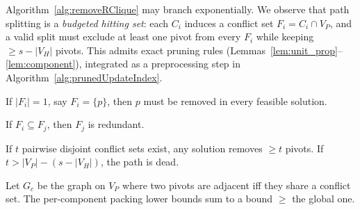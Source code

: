 
Algorithm~\ref{alg:removeRClique} may branch exponentially.
We observe that path splitting is a \emph{budgeted hitting set}: each $C_i$ induces a conflict set $F_i = C_i \cap V_P$, and a valid split must exclude at least one pivot from every $F_i$ while keeping $\ge s - |V_H|$ pivots.
This admits exact pruning rules (Lemmas~\ref{lem:unit_prop}--\ref{lem:component}), integrated as a preprocessing step in Algorithm~\ref{alg:prunedUpdateIndex}.

\begin{lemma}\label{lem:unit_prop}
If $|F_i| = 1$, say $F_i = \{p\}$, then $p$ must be removed in every feasible solution.
\end{lemma}

\begin{lemma}[Subsumption]\label{lem:subsumption}
If $F_i \subseteq F_j$, then $F_j$ is redundant.
\end{lemma}

\begin{lemma}\label{lem:packing_lb}
If $t$ pairwise disjoint conflict sets exist, any solution removes $\ge t$ pivots.
If $t > |V_P| - (s - |V_H|)$, the path is dead.
\end{lemma}

\begin{lemma}\label{lem:component}
Let $G_c$ be the graph on $V_P$ where two pivots are adjacent iff they share a conflict set.
The per-component packing lower bounds sum to a bound $\ge$ the global one.
\end{lemma}



